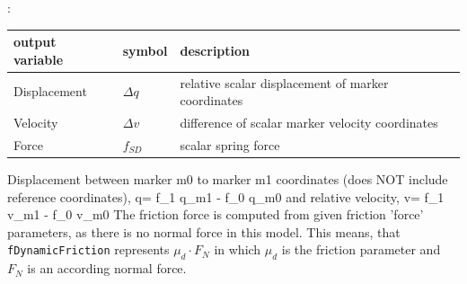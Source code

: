 :
\begin{center}
\footnotesize
\begin{longtable}{| p{5cm} | p{5cm} | p{6cm} |} 
\hline
\bf output variable & \bf symbol & \bf description \\ \hline
Displacement & $\Delta q$ & relative scalar displacement of marker coordinates\\ \hline
Velocity & $\Delta v$ & difference of scalar marker velocity coordinates\\ \hline
Force & $f_{SD}$ & scalar spring force\\ \hline
\end{longtable}
\end{center}
 \noindent
    \finishTable
    Displacement between marker m0 to marker m1 coordinates (does NOT include reference coordinates),
    \be
      q= f_1 \cdot q_{m1} - f_0 \cdot q_{m0}
    \ee
    and relative velocity,
    \be
      v= f_1 \cdot v_{m1} - f_0 \cdot v_{m0}
    \ee
    The friction force is computed from given friction 'force' parameters, as there is no normal force in this model.
    This means, that \texttt{fDynamicFriction} represents $\mu_d \cdot F_N$ in which $\mu_d$ is the friction parameter and 
    $F_N$ is an according normal force.
    
